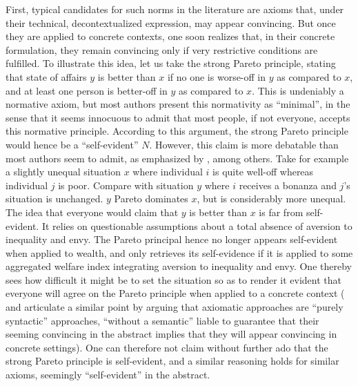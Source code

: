 \documentclass[preprint, french, english, 11pt, authoryear]{elsarticle}%
\begin{document}
First, typical candidates for such norms in the literature are axioms that, under their technical, decontextualized expression, may appear convincing. But once they are applied to concrete contexts, one soon realizes that, in their concrete formulation, they remain convincing only if very restrictive conditions are fulfilled. To illustrate this idea, let us take the strong Pareto principle, stating that state of affairs $y$ is better than $x$ if no one is worse-off in $y$ as compared to $x$, and at least one person is better-off in $y$ as compared to $x$. This is undeniably a normative axiom, but most authors present this normativity as ``minimal'', in the sense that it seems innocuous to admit that most people, if not everyone, accepts this normative principle. According to this argument, the strong Pareto principle would hence be a ``self-evident'' $N$. However, this claim is more debatable than most authors seem to admit, as emphasized by \cite{sen_rationality_2004}, among others. Take for example a slightly unequal situation $x$ where individual $i$ is quite well-off whereas individual $j$ is poor. Compare with situation $y$ where $i$ receives a bonanza and $j$'s situation is unchanged. $y$ Pareto dominates $x$, but is considerably more unequal. The idea that everyone would claim that $y$ is better than $x$ is far from self-evident. It relies on questionable assumptions about a total absence of aversion to inequality and envy. The Pareto principal hence no longer appears self-evident when applied to wealth, and only retrieves its self-evidence if it is applied to some aggregated welfare index integrating aversion to inequality and envy. One thereby sees how difficult it might be to set the situation so as to render it evident that everyone will agree on the Pareto principle when applied to a concrete context (\citet{mongin_axiomatisation_2003} and \citet{baujard_bien-etre_2015} articulate a similar point by arguing that axiomatic approaches are ``purely syntactic'' approaches, ``without a semantic'' liable to guarantee that their seeming convincing in the abstract implies that they will appear convincing in concrete settings). One can therefore not claim without further ado that the strong Pareto principle is self-evident, and a similar reasoning holds for similar axioms, seemingly ``self-evident'' in the abstract.
\end{document}
